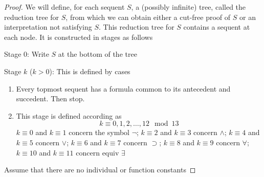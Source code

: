 \documentclass[11pt]{article}
\begin{document}
\begin{proof}
We will define, for each sequent \(S\), a (possibly infinite) tree, called the reduction tree
for \(S\), from which we can obtain either a cut-free proof of \(S\) or an interpretation not
satisfying \(S\). This reduction tree for \(S\) contains a sequent at each node. It is
constructed in stages as follows

Stage 0: Write \(S\) at the bottom of the tree

Stage \(k\) (\(k>0\)): This is defined by cases
\begin{enumerate}
\item Every topmost sequent has a formula common to its antecedent and succedent. Then stop.
\item This stage is defined according as
\begin{equation*}
k\equiv 0,1,2,\dots,12\mod 13
\end{equation*}
\(k\equiv0\) and \(k\equiv1\) concern the symbol \(\neg\); \(k\equiv2\) and \(k\equiv3\)
concern \(\wedge\); \(k\equiv4\) and \(k\equiv5\) concern \(\vee\); \(k\equiv6\)
and \(k\equiv7\) concern \(\supset\); \(k\equiv8\) and \(k\equiv9\)
concern \(\forall\); \(k\equiv10\) and \(k\equiv11\) concern equiv \(\exists\)
\end{enumerate}


Assume that there are no individual or function constants


\end{proof}
\end{document}
